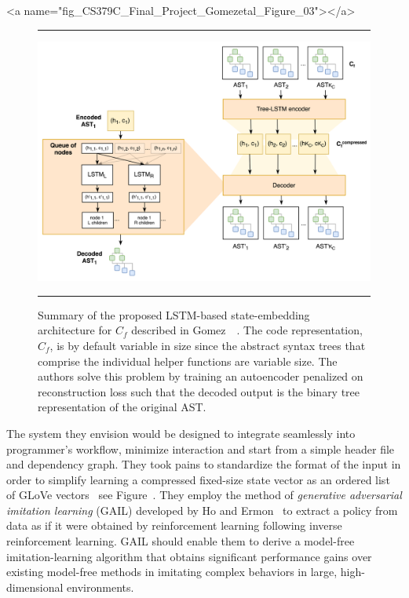 \setcounter{figure}{2}


\rawhtml
<a name="fig_CS379C_Final_Project_Gomezetal_Figure_03"></a>
\endrawhtml
\begin{figure}
%
  \hrule{}
%
  \begin{center}
    \includegraphics[width=10.0in]{./figures/CS379C_Final_Project_Gomezetal_Figure_03.png}
  \end{center}
%
  \caption{Summary of the proposed LSTM-based state-embedding architecture for $C_{f}$ described in Gomez~\etal{}~\cite{CS379C_Final_Project_Gomezetal-18}. The code representation, $C_{f}$, is by default variable in size since the abstract syntax trees that comprise the individual helper functions are variable size. The authors solve this problem by training an autoencoder penalized on reconstruction loss such that the decoded output is the binary tree representation of the original AST.}
%
  \hrule{}
%
\end{figure}


The system they envision would be designed to integrate seamlessly into programmer's workflow, minimize interaction and start from a simple header file and dependency graph. They took pains to standardize the format of the input in order to simplify learning a compressed fixed-size state vector as an ordered list of GLoVe vectors~\cite{PenningtonetalEMNLP-14} \emdash{} see Figure~{}. They employ the method of {\it{generative adversarial imitation learning}} (GAIL) developed by Ho and Ermon~\cite{HoandErmonCoRR-16} to extract a policy from data as if it were obtained by reinforcement learning following inverse reinforcement learning. GAIL should enable them to derive a model-free imitation-learning algorithm that obtains significant performance gains over existing model-free methods in imitating complex behaviors in large, high-dimensional environments.

